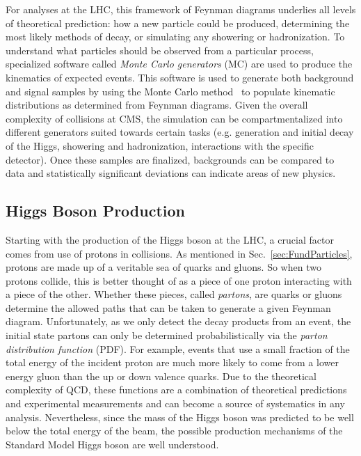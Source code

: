 For analyses at the LHC, this framework of Feynman diagrams underlies all levels of theoretical prediction: how a new particle could be produced, determining the most likely methods of decay, or simulating any showering or hadronization. To understand what particles should be observed from a particular process, specialized software called \textit{Monte Carlo generators} (MC) are used to produce the kinematics of expected events. This software is used to generate both background and signal samples by using the Monte Carlo method~\cite{MonteCarloMethod:1949} to populate kinematic distributions as determined from Feynman diagrams. Given the overall complexity of collisions at CMS, the simulation can be compartmentalized into different generators suited towards certain tasks (e.g. generation and initial decay of the Higgs, showering and hadronization, interactions with the specific detector). Once these samples are finalized, backgrounds can be compared to data and statistically significant deviations can indicate areas of new physics.

\subsection{Higgs Boson Production}
\label{sec:HiggsProduction}

Starting with the production of the Higgs boson at the LHC, a crucial factor comes from use of protons in collisions. As mentioned in Sec.~\ref{sec:FundParticles}, protons are made up of a veritable sea of quarks and gluons. So when two protons collide, this is better thought of as a piece of one proton interacting with a piece of the other. Whether these pieces, called \textit{partons}, are quarks or gluons determine the allowed paths that can be taken to generate a given Feynman diagram. Unfortunately, as we only detect the decay products from an event, the initial state partons can only be determined probabilistically via the \textit{parton distribution function} (PDF). For example, events that use a small fraction of the total energy of the incident proton are much more likely to come from a lower energy gluon than the up or down valence quarks. Due to the theoretical complexity of QCD, these functions are a combination of theoretical predictions and experimental measurements and can become a source of systematics in any analysis. Nevertheless, since the mass of the Higgs boson was predicted to be well below the total energy of the beam, the possible production mechanisms of the Standard Model Higgs boson are well understood.

